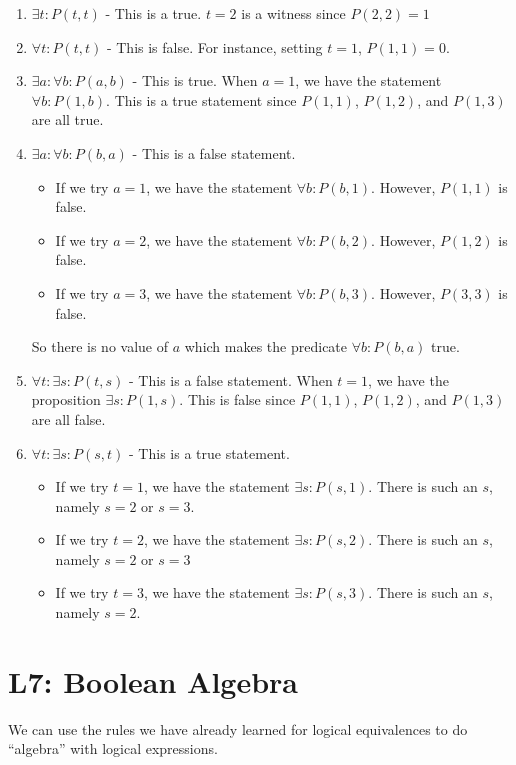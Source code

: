 \begin{solutions}
	\begin{enumerate}
		\item $\exists t: P(t,t)$ - This is a true.  $t = 2$ is a witness since $P(2,2) = 1$
		\item $\forall t: P(t,t)$ - This is false.  For instance, setting $t =1$, $P(1,1) = 0$.
		\item $\exists a: \forall b: P(a,b)$ - This is true.  When $a = 1$, we have the statement $\forall b: P(1,b)$.  This is a true statement since $P(1,1)$, $P(1,2)$, and $P(1,3)$ are all true.
		\item $\exists a: \forall b: P(b,a)$ - This is a false statement.  
		\begin{itemize}
			\item If we try $a = 1$, we have the statement $\forall b: P(b,1)$.  However, $P(1,1)$ is false.
			\item If we try $a = 2$, we have the statement $\forall b: P(b,2)$.  However, $P(1,2)$ is false.
			\item If we try $a = 3$, we have the statement $\forall b: P(b,3)$.  However, $P(3,3)$ is false.
		\end{itemize}
		
		So there is no value of $a$ which makes the predicate $\forall b: P(b,a)$ true.
		\item $\forall t: \exists s: P(t,s)$ - This is a false statement.  When $t  =1$, we have the proposition $\exists s: P(1,s)$.  This is false since $P(1,1)$, $P(1,2)$, and $P(1,3)$ are all false.
		\item $\forall t: \exists s: P(s,t)$  - This is a true statement.  
		
		\begin{itemize}
			\item If we try $t = 1$, we have the statement $\exists s: P(s,1)$.  There is such an $s$, namely $s = 2$ or $s = 3$.
			\item If we try $t = 2$, we have the statement $\exists s: P(s,2)$.  There is such an $s$, namely $s = 2$ or $s = 3$
			\item If we try $t = 3$, we have the statement $\exists s: P(s,3)$.  There is such an $s$, namely $s = 2$.
		\end{itemize}
	\end{enumerate}
\end{solutions}

\section{L7: Boolean Algebra}
We can use the rules we have already learned for logical equivalences to do ``algebra'' with logical expressions.

